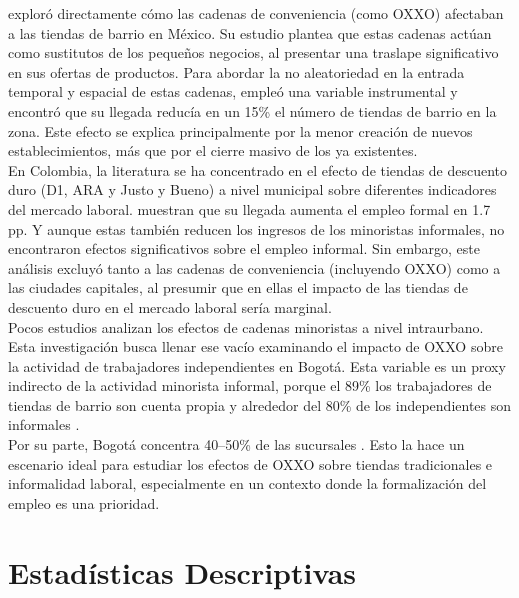 \documentclass{article}
\begin{document}
\textcite{marcos2022} exploró directamente cómo las cadenas de conveniencia (como OXXO) afectaban a las tiendas de barrio en México. Su estudio plantea que estas cadenas actúan como sustitutos de los pequeños negocios, al presentar una traslape significativo en sus ofertas de productos. Para abordar la no aleatoriedad en la entrada temporal y espacial de estas cadenas, empleó una variable instrumental y encontró que su llegada reducía en un 15\% el número de tiendas de barrio en la zona. Este efecto se explica principalmente por la menor creación de nuevos establecimientos, más que por el cierre masivo de los ya existentes. \\

En Colombia, la literatura se ha concentrado en el efecto de tiendas de descuento duro (D1, ARA y Justo y Bueno) a nivel municipal sobre diferentes indicadores del mercado laboral. \textcite{delgado2024} muestran que su llegada aumenta el empleo formal en 1.7 pp. Y aunque estas también reducen los ingresos de los minoristas informales, no encontraron efectos significativos sobre el empleo informal. Sin embargo, este análisis excluyó tanto a las cadenas de conveniencia (incluyendo OXXO) como a las ciudades capitales, al presumir que en ellas el impacto de las tiendas de descuento duro en el mercado laboral sería marginal. \\

Pocos estudios analizan los efectos de cadenas minoristas a nivel intraurbano. Esta investigación busca llenar ese vacío examinando el impacto de OXXO sobre la actividad de trabajadores independientes en Bogotá. Esta variable es un proxy indirecto de la actividad minorista informal, porque el 89\% los trabajadores de tiendas de barrio son cuenta propia \parencite{DANE2025a} y alrededor del 80\% de los independientes son informales \parencite{llanes2025}. \\

Por su parte, Bogotá concentra 40–50\% de las sucursales \parencite{godoy2025}. Esto la hace un escenario ideal para estudiar los efectos de OXXO sobre tiendas tradicionales e informalidad laboral, especialmente en un contexto donde la formalización del empleo es una prioridad.\\

\section{Estadísticas Descriptivas} 
\end{document}
